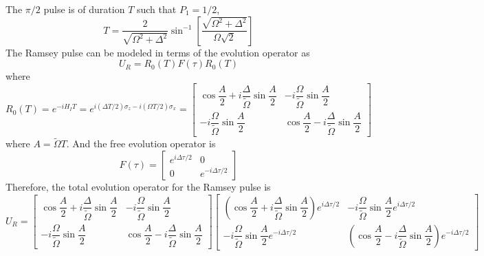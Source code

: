 \documentclass[aps,prl,onecolumn,notitlepage,showpacs,floatfix,superscriptaddress]{revtex4-1}
\begin{document}
The $\pi/2$ pulse is of duration $T$ such that $P_1=1/2$,
\begin{equation}
T = \dfrac{2}{\sqrt{\Omega^2+\Delta^2}} \sin^{-1} \left[\dfrac{\sqrt{\Omega^2+\Delta^2}}{\Omega \sqrt{2}} \right]
\end{equation}
The Ramsey pulse can be modeled in terms of the evolution operator as
\begin{equation}
U_{R} = R_0 (T) F(\tau) R_0(T) 
\end{equation}
where
\begin{equation}
R_0(T) = e^{-i H_I T} = e^{i(\Delta T/2) \sigma_z-i(\Omega T/2) \sigma_x} = \left[ \begin{array}{cc}
\cos\dfrac{A}{2} + i \dfrac{\Delta}{\tilde{\Omega}} \sin\dfrac{A}{2} & -i \dfrac{\Omega}{\tilde{\Omega}} \sin\dfrac{A}{2} \\ 
-i \dfrac{\Omega}{\tilde{\Omega}} \sin\dfrac{A}{2}  & \cos\dfrac{A}{2} - i \dfrac{\Delta}{\tilde{\Omega}} \sin\dfrac{A}{2} 
\end{array}\right]
\end{equation}
where $A = \tilde{\Omega}T$. And the free evolution operator is
\begin{equation}
F(\tau) = \left[ \begin{array}{cc}
e^{i\Delta \tau/2} & 0 \\ 
0 & e^{-i\Delta \tau/2}
\end{array}\right]
\end{equation}
Therefore, the total evolution operator for the Ramsey pulse is
\begin{equation}
U_{R} = \left[ \begin{array}{cc}
\cos\dfrac{A}{2} + i \dfrac{\Delta}{\tilde{\Omega}} \sin\dfrac{A}{2} & -i \dfrac{\Omega}{\tilde{\Omega}} \sin\dfrac{A}{2} \\ 
-i \dfrac{\Omega}{\tilde{\Omega}} \sin\dfrac{A}{2}  & \cos\dfrac{A}{2} - i \dfrac{\Delta}{\tilde{\Omega}} \sin\dfrac{A}{2} 
\end{array}\right] \left[ \begin{array}{cc}
\left(\cos\dfrac{A}{2} + i \dfrac{\Delta}{\tilde{\Omega}} \sin\dfrac{A}{2}\right)e^{i\Delta \tau/2} & -i \dfrac{\Omega}{\tilde{\Omega}} \sin\dfrac{A}{2} e^{i\Delta \tau/2} \\ 
-i \dfrac{\Omega}{\tilde{\Omega}} \sin\dfrac{A}{2} e^{-i\Delta \tau/2} & \left(\cos\dfrac{A}{2} - i \dfrac{\Delta}{\tilde{\Omega}} \sin\dfrac{A}{2} \right)e^{-i\Delta \tau/2}
\end{array}\right]
\end{equation}
\end{document}
